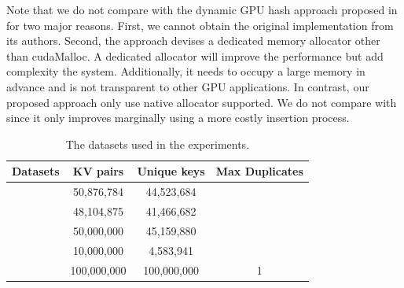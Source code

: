 Note that we do not compare with the dynamic GPU hash approach proposed in \cite{ashkiani2018dynamic} for two major reasons. First, we cannot obtain the original implementation from its authors. Second, the approach devises a dedicated memory allocator other than cudaMalloc. A dedicated allocator will improve the performance but add complexity the system. Additionally, it needs to occupy a large memory in advance and is not transparent to other GPU applications.
In contrast, our proposed approach only use native allocator supported. 
We do not compare with \cite{breslow2016horton} since it only improves \megakv marginally using a more costly insertion process.

\begin{table}[t]
	\caption{The datasets used in the experiments.}
	\label{table:exp_data_sets}
	\centering
	\begin{tabular}{|c|c|c|c|}
		\hline
		Datasets & KV pairs & Unique keys & Max Duplicates \\ \hline
		\dstwitter &50,876,784 & 44,523,684&\\ \hline
		\dsreddit & 48,104,875 & 41,466,682 & \\ \hline
		\dstpch &50,000,000 & 45,159,880&\\ \hline
		\dsali &10,000,000 & 4,583,941&\\ \hline
		\dsrandom & 100,000,000& 100,000,000& 1 \\ \hline
	\end{tabular}
\end{table}

